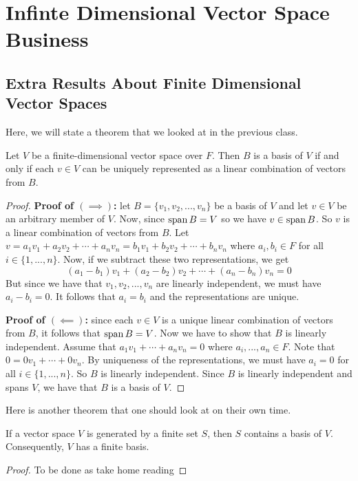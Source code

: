 \documentclass[main.tex]{subfiles}
\begin{document}
    \chapter{Infinte Dimensional Vector Space Business}

    \section{Extra Results About Finite Dimensional Vector Spaces}
    Here, we will state a theorem that we looked at in the previous class. 
    \begin{thrm}{}{}
        Let $V$ be a finite-dimensional vector space over $F$. Then $B$ is a basis of $V$ if and only if each $v\in V$ can be uniquely represented as a linear combination of vectors from $B$.
    \end{thrm}
    \begin{proof}
        \textbf{Proof of $(\implies)$:} let $B = \{v_1, v_2, ..., v_n\}$ be a basis of $V$ and let $v\in V$ be an arbitrary member of $V$. Now, since $\operatorname{span} B = V$ so we have $v\in \operatorname{span} B$. So $v$ is a linear combination of vectors from $B$. Let $v = a_1v_1 + a_2v_2 + \cdots + a_nv_n = b_1v_1 + b_2v_2 + \cdots + b_nv_n$ where $a_i,b_i\in F$ for all $i\in \{1, ..., n\}$. Now, if we subtract these two representations, we get 
        \begin{equation}
            (a_1 - b_1)v_1 + (a_2 - b_2)v_2 + \cdots + (a_n - b_n)v_n = 0
        \end{equation}
        But since we have that $v_1, v_2, ..., v_n$ are linearly independent, we must have $a_i - b_i = 0$. It follows that $a_i = b_i$ and the representations are unique. \bigbreak 

        \noindent \textbf{Proof of $(\impliedby)$:} since each $v\in V$ is a unique linear combination of vectors from $B$, it follows that $\operatorname{span} B = V$. Now we have to show that $B$ is linearly independent. Assume that $a_1v_1 + \cdots + a_nv_n = 0$ where $a_i, ..., a_n \in F$. Note that $0 = 0v_1 + \cdots + 0v_n$. By uniqueness of the representations, we must have $a_i = 0$ for all $i\in \{1, ..., n\}$. So $B$ is linearly independent. Since $B$ is linearly independent and spans $V$, we have that $B$ is a basis of $V$.
    \end{proof}

    Here is another theorem that one should look at on their own time. 
    \begin{thrm}{}{}
        If a vector space $V$ is generated by a finite set $S$, then $S$ contains a basis of $V$. Consequently, $V$ has a finite basis. 
    \end{thrm}
    \begin{proof}
        To be done as take home reading
    \end{proof}
\end{document}
